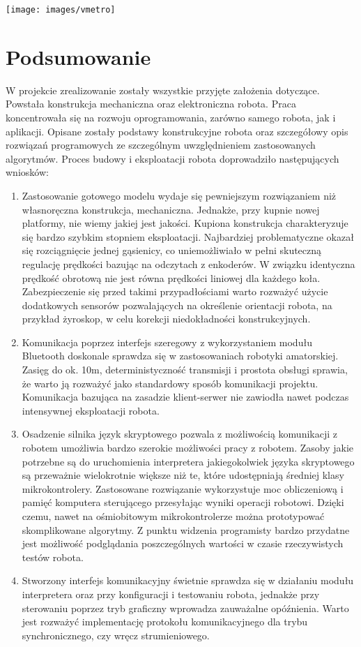 \documentclass[eng,printmode]{mgr}
\begin{document}
\begin{center}
  \texttt{[image: images/vmetro]}
\end{center}


\chapter{Podsumowanie}
W projekcie zrealizowanie zostały wszystkie przyjęte założenia dotyczące. Powstała konstrukcja mechaniczna oraz elektroniczna robota. Praca koncentrowała się na rozwoju oprogramowania, zarówno samego robota, jak i aplikacji. Opisane zostały podstawy konstrukcyjne robota oraz szczegółowy opis rozwiązań programowych ze szczególnym uwzględnieniem zastosowanych algorytmów. Proces budowy i eksploatacji robota doprowadziło następujących wniosków:
\begin{enumerate}
 \item Zastosowanie gotowego modelu wydaje się pewniejszym rozwiązaniem niż własnoręczna konstrukcja, mechaniczna. Jednakże, przy kupnie nowej platformy, nie wiemy jakiej jest jakości. Kupiona konstrukcja charakteryzuje się bardzo szybkim stopniem eksploatacji. Najbardziej problematyczne okazał się rozciągnięcie jednej gąsienicy, co uniemożliwiało w pełni skuteczną regulację prędkości bazując na odczytach z enkoderów. W związku identyczna prędkość obrotową nie jest równa prędkości liniowej dla każdego koła. Zabezpieczenie się przed takimi przypadłościami warto rozważyć użycie dodatkowych sensorów pozwalających na określenie orientacji robota, na przykład żyroskop, w celu korekcji niedokładności konstrukcyjnych.
 \item Komunikacja poprzez interfejs szeregowy z wykorzystaniem modułu Bluetooth doskonale sprawdza się w zastosowaniach robotyki amatorskiej. Zasięg do ok. 10m, deterministyczność transmisji i prostota obsługi sprawia, że warto ją rozważyć jako standardowy sposób komunikacji projektu. Komunikacja bazująca na zasadzie klient-serwer nie zawiodła nawet podczas intensywnej eksploatacji robota.
 \item Osadzenie silnika język skryptowego pozwala z możliwością komunikacji z robotem umożliwia bardzo szerokie możliwości pracy z robotem. Zasoby jakie potrzebne są do uruchomienia interpretera jakiegokolwiek języka skryptowego są przeważnie wielokrotnie większe niż te, które udostępniają średniej klasy mikrokontrolery. Zastosowane rozwiązanie wykorzystuje moc obliczeniową i pamięć komputera sterującego przesyłając wyniki operacji robotowi. Dzięki czemu, nawet na ośmiobitowym mikrokontrolerze można prototypować skomplikowane algorytmy. Z punktu widzenia programisty bardzo przydatne jest możliwość podglądania poszczególnych wartości w czasie rzeczywistych testów robota.
 \item Stworzony  interfejs komunikacyjny świetnie sprawdza się w działaniu modułu interpretera oraz przy konfiguracji  i testowaniu robota, jednakże przy sterowaniu poprzez tryb graficzny wprowadza zauważalne opóźnienia. Warto jest rozważyć implementację protokołu komunikacyjnego dla trybu synchronicznego, czy wręcz strumieniowego. 
\end{enumerate}
\end{document}
